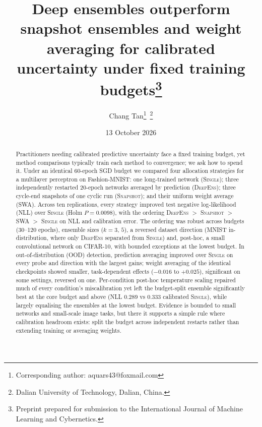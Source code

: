 \documentclass[11pt,a4paper]{article}
\newcommand{\deepens}{\textsc{DeepEns}}
\newcommand{\snapshot}{\textsc{Snapshot}}
\newcommand{\swa}{\textsc{SWA}}
\newcommand{\single}{\textsc{Single}}
\begin{document}
\title{Deep ensembles outperform snapshot ensembles and weight
averaging for calibrated uncertainty under fixed training
budgets\thanks{Preprint prepared for submission
to the International Journal of Machine Learning and Cybernetics.}}
\author{Chang Tan\thanks{Corresponding author: aquars43@foxmail.com}\,%
\thanks{Dalian University of Technology, Dalian, China.}}
\date{13 October 2026}
\maketitle

\begin{abstract}
\noindent Practitioners needing calibrated predictive uncertainty face a fixed
training budget, yet method comparisons typically train each method to
convergence; we ask how to spend it. Under an identical 60-epoch SGD budget we compared four allocation
strategies for a multilayer perceptron on Fashion-MNIST: one long-trained network
(\single); three independently restarted 20-epoch networks averaged by
prediction (\deepens); three cycle-end snapshots of one cyclic run (\snapshot); and their uniform weight average
(\swa). Across ten replications, every strategy improved test
negative log-likelihood (NLL) over \single{} (Holm $P=0.0098$),
with the ordering \deepens{} $>$ \snapshot{} $>$ \swa{} $>$ \single{} on
NLL and calibration error. The ordering was robust across budgets
(30--120 epochs), ensemble sizes ($k=3$, $5$), a reversed dataset
direction (MNIST in-distribution, where only \deepens{} separated from
\single{}) and, post-hoc, a small convolutional network on CIFAR-10, with bounded exceptions at the lowest budget. In
out-of-distribution (OOD) detection, prediction averaging improved over
\single{} on every probe and direction with the largest gains; weight averaging of the identical checkpoints showed smaller,
task-dependent effects ($-0.016$ to $+0.025$), significant on some
settings, reversed on one. Per-condition post-hoc temperature scaling
repaired much of every condition's miscalibration yet left the
budget-split ensemble significantly best at the core budget and above
(NLL 0.289 vs 0.333 calibrated \single{}), while largely
equalising the ensembles at the lowest budget. Evidence is bounded to small networks and small-scale image tasks, but there it
supports a simple rule where calibration headroom exists:
split the budget across independent restarts rather than extending
training or averaging weights.
\end{abstract}
\end{document}
